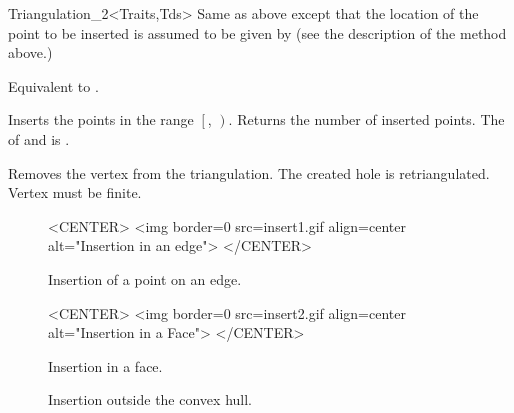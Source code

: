 \begin{ccRefClass}{Triangulation_2<Traits,Tds>}
{Same as above except that the location of the point
  to be inserted is assumed to be given by
 (see the description of the  method above.)}

{Equivalent to .}

{Inserts the points in the range
 $\left[\right.$, $\left.\right)$.
 Returns the number of inserted points.
 \ccPrecond The  of  and 
 is .}

{Removes the vertex from the triangulation. The created hole is 
 retriangulated.
 \ccPrecond Vertex  must be finite.}


\begin{figure}
\begin{ccTexOnly}
\begin{center}

\end{center}
\end{ccTexOnly}
\caption{Insertion of a point on an edge.
\label{Triangulation_ref_Fig_inser1t}}

\begin{ccHtmlOnly}
<CENTER>
<img border=0 src=insert1.gif align=center alt="Insertion in an edge">
</CENTER>
\end{ccHtmlOnly}
\end{figure}




\begin{figure}
\begin{ccTexOnly}
\begin{center}

\end{center}
\end{ccTexOnly}
\caption{Insertion in a face.
\label{Triangulation_ref_Fig_insert2}}

\begin{ccHtmlOnly}
<CENTER>
<img border=0 src=insert2.gif align=center alt="Insertion in a Face">
</CENTER>
\end{ccHtmlOnly}
\end{figure}


\begin{figure}
\begin{ccTexOnly}
\begin{center}

\end{center}
\end{ccTexOnly}
\caption{Insertion outside the convex hull.
\label{Triangulation_ref_Fig_insert3}}


\end{figure}
\end{ccRefClass}
